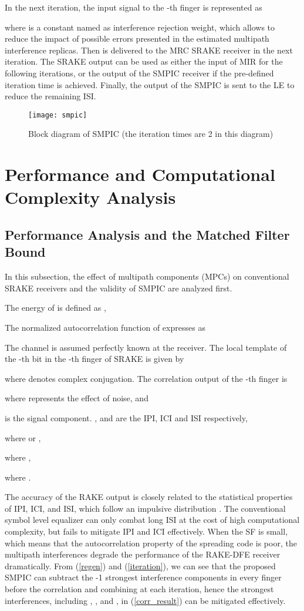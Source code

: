 \documentclass[journal]{IEEEtran}
\begin{document}
In the next iteration, the input signal to the -th finger is
represented as

where  is a constant named as interference rejection
weight, which allows to reduce the impact of possible errors
presented in the estimated multipath interference replicas. Then
 is delivered to the MRC SRAKE receiver in the next
iteration. The SRAKE output can be used as either the input of MIR
for the following iterations, or the output of the SMPIC receiver if
the pre-defined iteration time  is achieved. Finally, the output
of the SMPIC is sent to the LE to reduce the remaining ISI.

\begin{figure}[t]
\begin{center}
  \texttt{[image: smpic]}
  \caption{Block diagram of SMPIC (the iteration times  are 2 in this diagram)}
  \label{smpic}
\end{center}
\end{figure}

\section{Performance and Computational Complexity Analysis}

\subsection{Performance Analysis and the Matched Filter Bound}
In this subsection, the effect of multipath components (MPCs) on
conventional SRAKE receivers and the validity of SMPIC are analyzed
first.

The energy of  is defined as ,

The normalized autocorrelation function of  expresses as


The channel is assumed perfectly known at the receiver. The local
template of the -th bit in the -th finger of SRAKE
is given by

where  denotes complex conjugation. The correlation output of the -th finger is

where  represents the effect of noise, and

is the signal component. ,  and  are the IPI, ICI and
ISI respectively,

where  or ,

where ,

where .

The accuracy of the RAKE output is closely related to the
statistical properties of IPI, ICI, and ISI, which follow an
impulsive distribution \cite{Interference ICC}. The conventional
symbol level equalizer can only combat long ISI at the cost of high
computational complexity, but fails to mitigate IPI and ICI
effectively. When the SF is small, which means that the
autocorrelation property of the spreading code is poor, the
multipath interferences degrade the performance of the RAKE-DFE
receiver dramatically. From (\ref{regen}) and (\ref{iteration}), we
can see that the proposed SMPIC can subtract the -1 strongest
interference components in every finger before the correlation and
combining at each iteration, hence the strongest interferences,
including , , and , in (\ref{corr_result}) can be
mitigated effectively.
\end{document}
